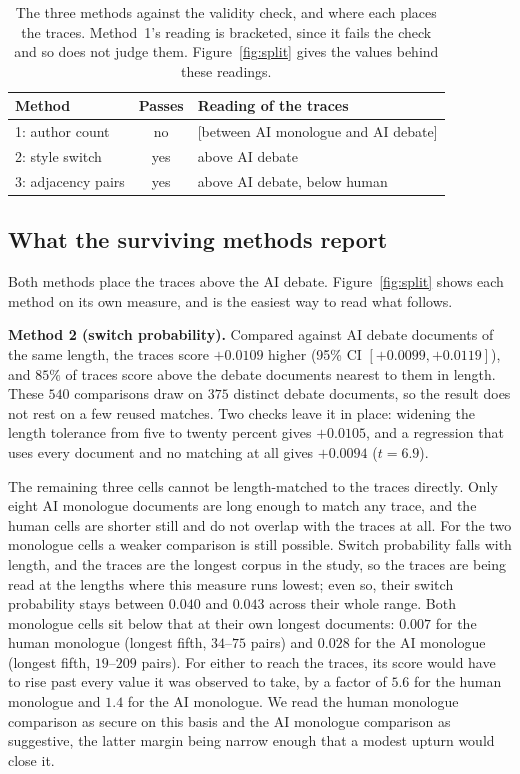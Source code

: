\documentclass[10pt,twocolumn]{article}
\begin{document}
\begin{table}[t]
\centering
\small
\setlength{\tabcolsep}{3.5pt}
\caption{The three methods against the validity check, and where each places the traces. Method~1's
reading is bracketed, since it fails the check and so does not judge them. Figure~\ref{fig:split}
gives the values behind these readings.}
\label{tab:verdict}
\begin{tabular}{@{}lcl@{}}
\toprule
Method & Passes & Reading of the traces \\
\midrule
1: author count & no & [between AI monologue and AI debate] \\
2: style switch & yes & above AI debate \\
3: adjacency pairs & yes & above AI debate, below human \\
\bottomrule
\end{tabular}
\end{table}

\subsection{What the surviving methods report}
Both methods place the traces above the AI debate. Figure~\ref{fig:split} shows each method on its
own measure, and is the easiest way to read what follows.

\textbf{Method 2 (switch probability).} Compared against AI debate documents of the same length, the
traces score $+0.0109$ higher (95\% CI $[+0.0099,+0.0119]$), and $85\%$ of traces score above the
debate documents nearest to them in length. These $540$ comparisons draw on $375$ distinct debate
documents, so the result does not rest on a few reused matches. Two checks leave it in place:
widening the length tolerance from five to twenty percent gives $+0.0105$, and a regression that uses
every document and no matching at all gives $+0.0094$ ($t=6.9$).

The remaining three cells cannot be length-matched to the traces directly. Only eight AI monologue
documents are long enough to match any trace, and the human cells are shorter still and do not
overlap with the traces at all. For the two monologue cells a weaker comparison is still possible.
Switch probability falls with length, and the traces are the longest corpus in the study, so the
traces are being read at the lengths where this measure runs lowest; even so, their switch
probability stays between $0.040$ and $0.043$ across their whole range. Both monologue cells sit
below that at their own longest documents: $0.007$ for the human monologue (longest fifth, $34$--$75$
pairs) and $0.028$ for the AI monologue (longest fifth, $19$--$209$ pairs). For either to reach the
traces, its score would have to rise past every value it was observed to take, by a factor of $5.6$
for the human monologue and $1.4$ for the AI monologue. We read the human monologue comparison as
secure on this basis and the AI monologue comparison as suggestive, the latter margin being narrow
enough that a modest upturn would close it.
\end{document}
